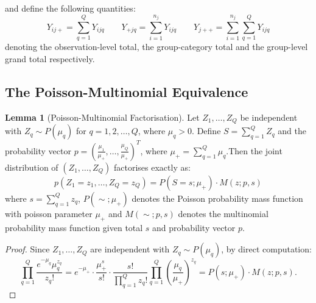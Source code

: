 \documentclass[]{article}
\theoremstyle{definition}
\newtheorem{lemma}{Lemma}
\begin{document}

	
	and define the following quantities:
	\begin{equation}
		Y_{ij+}=\sum_{q=1}^{Q}Y_{ijq} \qquad Y_{+jq}=\sum_{i=1}^{n_{j}}Y_{ijq} \qquad Y_{j++}=\sum_{i=1}^{n_{j}}\sum_{q=1}^{Q}Y_{ijq}
	\end{equation}
denoting the observation-level total, the group-category total and the group-level grand total respectively.
	
	\subsection{The Poisson-Multinomial Equivalence}
	\begin{lemma}[Poisson-Multinomial Factorisation]\label{PMF}
		Let $Z_{1},\dots ,Z_{Q}$ be independent with $Z_{q}\sim P(\mu_{q})$ for $q=1,2,\dots ,Q$, where $\mu_{q}>0$. Define $S=\sum_{q=1}^{Q}Z_{q}$ and the probability vector $p=(\frac{\mu_1}{\mu_{+}},\dots ,\frac{\mu_Q}{\mu_{+}})^{T}$, where $\mu_{+}=\sum_{q=1}^{Q}\mu_{q}$.Then the joint distribution of $(Z_{1},\dots,Z_{Q})$ factorises exactly as:
		\begin{equation}
			p(Z_{1}=z_{1},\dots ,Z_{Q}=z_{Q})=P(S=s;\mu_{+})\cdot M(z;p,s)
		\end{equation}
		where $s=\sum_{q=1}^{Q}z_{q}$, $P(\sim ;\mu_{+})$ denotes the Poisson probability mass function with poisson parameter $\mu_{+}$ and $M(\sim ;p,s)$ denotes the multinomial probability mass function given total $s$ and probability vector $p$.
	\end{lemma}
	
	\begin{proof}
		Since $Z_{1},\dots ,Z_{Q}$ are independent with $Z_{q}\sim P(\mu_{q})$, by direct computation:
		\begin{equation}
			\prod_{q=1}^{Q} \frac{e^{-\mu_{q}}\mu_{q}^{z_{q}}}{z_{q}!}=e^{-\mu_{+}}\cdot \frac{\mu_{+}^{s}}{s!}\cdot \frac{s!}{\prod_{q=1}^{Q}z_{q}!} \prod_{q=1}^{Q}(\frac{\mu_{q}}{\mu_{+}})^{z_{q}}= P(s;\mu_{+})\cdot M(z;p,s).
		\end{equation}
	\end{proof}
	
\end{document}
